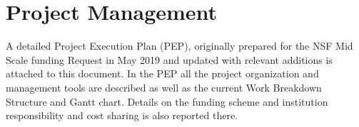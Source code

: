 \section{Project Management}
\label{sec:ProjectManagement}




A detailed Project Execution Plan (PEP), originally prepared for the NSF Mid Scale funding Request in May 2019 and updated with relevant additions is attached to this document. In the PEP all the project organization and management tools are described as well as the current Work Breakdown Structure and Gantt chart. Details on the funding scheme and institution responsibility and cost sharing is also reported there. 

